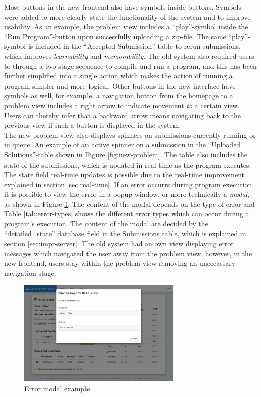 Most buttons in the new frontend also have symbols inside buttons. Symbols were added to more clearly state the functionality of the system and to improve usability. As an example, the problem view includes a ``play''-symbol inside the ``Run Program''-button upon successfully uploading a zip-file. The same ``play''-symbol is included in the ``Accepted Submission'' table to rerun submissions, which improves \textit{learnability} and \textit{memorability}. The old system also required users to through a two-stage sequence to compile and run a program, and this has been further simplified into a single action which makes the action of running a program simpler and more logical. Other buttons in the new interface have symbols as well, for example, a navigation button from the homepage to a problem view includes a right arrow to indicate movement \textit{to} a certain view. Users can thereby infer that a backward arrow means navigating back to the previous view if such a button is displayed in the system.
 \\

The new problem view also displays spinners on submissions currently running or in queue. An example of an active spinner on a submission in the ``Uploaded Solutions''-table shown in Figure \ref{fig:new-problem}. The table also includes the state of the submissions, which is updated in real-time as the program executes. The state field real-time updates is possible due to the real-time improvement explained in section \ref{sec:real-time}. If an error occurrs during program execution, it is possible to view the error in a popup window, or more technically a \textit{modal}, as shown in Figure \ref{fig:error-modal}. The content of the modal depends on the type of error and Table \ref{tab:error-types} shows the different error types which can occur during a program's execution. The content of the modal are decided by the ``detailed\_state'' database field in the Submissions table, which is explained in section  \ref{sec:impr-server}. The old system had an own view displaying error messages which navigated the user away from the problem view, however, in the new frontend, users stay within the problem view removing an uneccassary navigation stage. \\

\begin{figure}
    \centering
    \includegraphics[width=0.7\textwidth]{figs/error_modal.jpg}
    \caption[Error modal example]{Error modal example}
    \label{fig:error-modal}
\end{figure}

